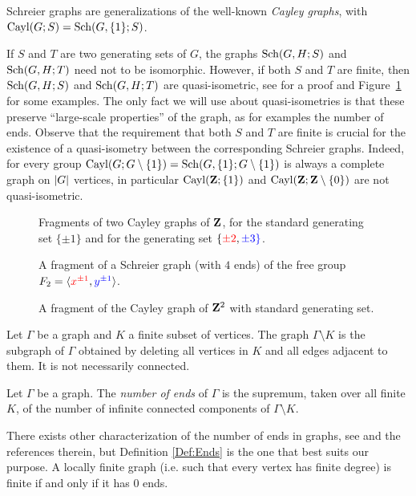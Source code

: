 Schreier graphs are generalizations of the well-known \emph{Cayley graphs}, with $\operatorname{Cayl}(G;S)=\operatorname{Sch}(G,\{1\};S)$.

If $S$ and $T$ are two generating sets of $G$, the graphs $\operatorname{Sch}(G,H;S)$ and $\operatorname{Sch}(G,H;T)$ need not to be isomorphic. However, if both $S$ and $T$ are finite, then $\operatorname{Sch}(G,H;S)$ and $\operatorname{Sch}(G,H;T)$ are quasi-isometric, see \cite[IV.B.21.iii]{DelaHarpe2000} for a proof and Figure~\ref{Figure:CayleyOfZ} for some examples. The only fact we will use about quasi-isometries is that these preserve ``large-scale properties'' of the graph, as for examples the number of ends.
Observe that the requirement that both $S$ and $T$ are finite is crucial for the existence of a quasi-isometry between the corresponding Schreier graphs. Indeed, for every group  $\operatorname{Cayl}(G;G\setminus\{1\})=\operatorname{Sch}(G,\{1\};G\setminus\{1\})$ is always a complete graph on $\lvert G\rvert$ vertices, in particular  $\operatorname{Cayl}(\mathbf{Z};\{1\})$ and $\operatorname{Cayl}(\mathbf{Z};\mathbf{Z}\setminus\{0\})$ are not quasi-isometric.

%
%
\begin{figure}[htbp]\centering

\caption{Fragments of two Cayley graphs of $\mathbf{Z}$, for the standard generating set $\{\pm1\}$ and for the generating set $\{\textcolor{red}{\pm2},\textcolor{blue}{\pm3\}}$.}
\label{Figure:CayleyOfZ}
\end{figure}
\begin{figure}[htbp]\centering

\caption{A fragment of a Schreier graph (with $4$ ends) of the free group $F_2=\langle \textcolor{red}{x^{\pm1}},\textcolor{blue}{y^{\pm1}}\rangle$.}
\label{Figure:SchreierOfF2}
\end{figure}
\begin{figure}[htbp]\centering

\caption{A fragment of the Cayley graph of $\mathbf{Z}^2$ with standard generating set.}
\label{Figure:CayleyOfZ2}
\end{figure}
%
%

Let $\Gamma$ be a graph and $K$ a finite subset of vertices. The graph $\Gamma\setminus K$ is the subgraph of $\Gamma$ obtained by deleting all vertices in $K$ and all edges adjacent to them. It is not necessarily connected.
\begin{defn}\label{Def:Ends}
Let $\Gamma$ be a graph. The \emph{number of ends} of $\Gamma$ is the supremum, taken over all finite $K$, of the number of infinite connected components of $\Gamma\setminus K$.
\end{defn}
There exists other characterization of the number of ends in graphs, %
see \cite{MR1967888} and the references therein, but Definition \ref{Def:Ends} is the one that best suits our purpose.
A locally finite graph (i.e. such that every vertex has finite degree) is finite if and only if it has $0$ ends.

